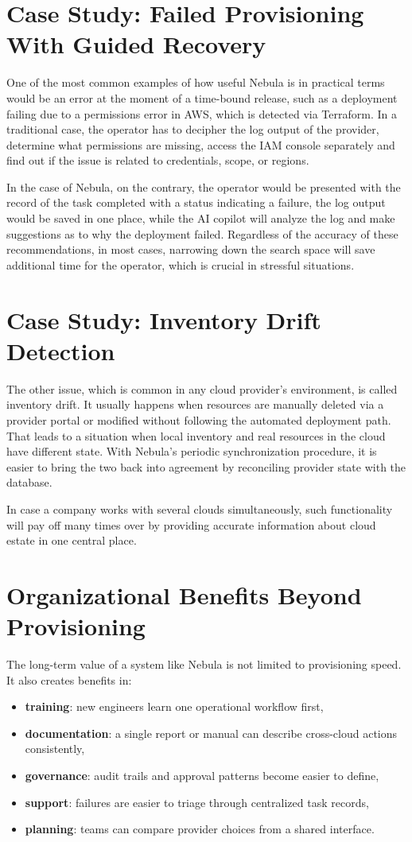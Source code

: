 \section{Case Study: Failed Provisioning With Guided Recovery}
One of the most common examples of how useful Nebula is in practical terms would be an error at the moment of a time-bound release, such as a deployment failing due to a permissions error in AWS, which is detected via Terraform. In a traditional case, the operator has to decipher the log output of the provider, determine what permissions are missing, access the IAM console separately and find out if the issue is related to credentials, scope, or regions.


In the case of Nebula, on the contrary, the operator would be presented with the record of the task completed with a status indicating a failure, the log output would be saved in one place, while the AI copilot will analyze the log and make suggestions as to why the deployment failed. Regardless of the accuracy of these recommendations, in most cases, narrowing down the search space will save additional time for the operator, which is crucial in stressful situations.


\section{Case Study: Inventory Drift Detection}


The other issue, which is common in any cloud provider's environment, is called inventory drift. It usually happens when resources are manually deleted via a provider portal or modified without following the automated deployment path. That leads to a situation when local inventory and real resources in the cloud have different state. With Nebula's periodic synchronization procedure, it is easier to bring the two back into agreement by reconciling provider state with the database.


In case a company works with several clouds simultaneously, such functionality will pay off many times over by providing accurate information about cloud estate in one central place.


\section{Organizational Benefits Beyond Provisioning}
The long-term value of a system like Nebula is not limited to provisioning speed. It also creates benefits in:
\begin{itemize}
    \item \textbf{training}: new engineers learn one operational workflow first,
    \item \textbf{documentation}: a single report or manual can describe cross-cloud actions consistently,
    \item \textbf{governance}: audit trails and approval patterns become easier to define,
    \item \textbf{support}: failures are easier to triage through centralized task records,
    \item \textbf{planning}: teams can compare provider choices from a shared interface.
\end{itemize}

